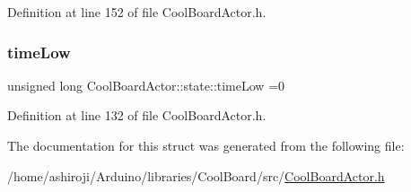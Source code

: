 Definition at line 152 of file Cool\+Board\+Actor.\+h.

\mbox{\label{struct_cool_board_actor_1_1state_a314c53c146e8c7b12c025323a34fbb9a}} 
\subsubsection{\texorpdfstring{time\+Low}{timeLow}}
{\footnotesize\ttfamily unsigned long Cool\+Board\+Actor\+::state\+::time\+Low =0}



Definition at line 132 of file Cool\+Board\+Actor.\+h.



The documentation for this struct was generated from the following file\+:\begin{DoxyCompactItemize}
\item 
/home/ashiroji/\+Arduino/libraries/\+Cool\+Board/src/\hyperlink{_cool_board_actor_8h}{Cool\+Board\+Actor.\+h}\end{DoxyCompactItemize}
